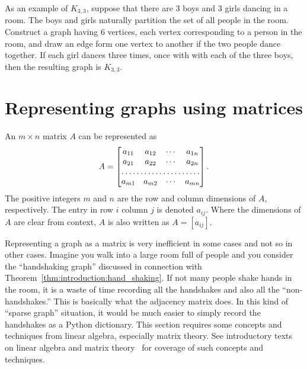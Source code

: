 As an example of $K_{3,3}$, suppose that there are $3$ boys and $3$
girls dancing in a room. The boys and girls naturally partition the
set of all people in the room. Construct a graph having $6$ vertices,
each vertex corresponding to a person in the room, and draw an edge
form one vertex to another if the two people dance together. If each
girl dances three times, once with with each of the three boys, then
the resulting graph is $K_{3,3}$.



\section{Representing graphs using matrices}
\label{sec:introduction:matrix_representation}

An $m \times n$ matrix $A$ can be represented as
\[
A
=
\begin{bmatrix}
a_{11} & a_{12} & \cdots & a_{1n} \\
a_{21} & a_{22} & \cdots & a_{2n} \\
\hdotsfor{4} \\
a_{m1} & a_{m2} & \cdots & a_{mn} \\
\end{bmatrix}.
\]
The positive integers $m$ and $n$ are the row and column dimensions of
$A$, respectively. The entry in row $i$ column $j$ is denoted
$a_{ij}$. Where the dimensions of $A$ are clear from context, $A$ is
also written as $A = [a_{ij}]$.

Representing a graph as a matrix is very inefficient in some cases and
not so in other cases. Imagine you walk into a large room full of
people and you consider the ``handshaking graph'' discussed in
connection with Theorem~\ref{thm:introduction:hand_shaking}. If not
many people shake hands in the room, it is a waste of time recording
all the handshakes and also all the ``non-handshakes.'' This is
basically what the adjacency matrix does. In this kind of
``sparse graph'' situation, it would be much easier to simply record
the handshakes as a Python dictionary. This section requires some
concepts and techniques from linear algebra, especially matrix
theory. See introductory texts on linear algebra and matrix
theory~\cite{Beezer2009} for coverage of such concepts and techniques.



